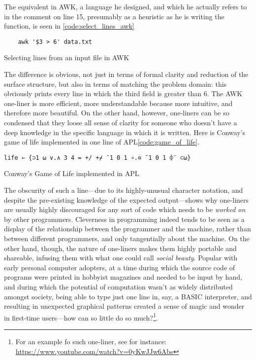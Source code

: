 The equivalent in AWK, a language he designed, and which he actually refers to in the comment on line 15, presumably as a heuristic as he is writing the function, is seen in \ref{code:select_lines_awk}

\begin{listing}
  \begin{verbatim}
    awk '$3 > 6' data.txt
  \end{verbatim}
  \caption{Selecting lines from an input file in AWK}
  \label{code:select_lines_awk}
\end{listing}

The difference is obvious, not just in terms of formal clarity and reduction of the surface structure, but also in terms of matching the problem domain: this obviously prints every line in which the third field is greater than 6. The AWK one-liner is more efficient, more understandable because more intuitive, and therefore more beautiful. On the other hand, however, one-liners can be so condensed that they loose all sense of clarity for someone who doesn't have a deep knowledge in the specific language in which it is written. Here is Conway's game of life implemented in one line of APL\ref{code:game_of_life}.

\begin{listing}
  \begin{verbatim}
life ← {⊃1 ⍵ ∨.∧ 3 4 = +/ +⌿ ¯1 0 1 ∘.⊖ ¯1 0 1 ⌽¨ ⊂⍵}
\end{verbatim}
  \caption{Conway's Game of Life implemented in APL}
  \label{code:game_of_life}
\end{listing}

The obscurity of such a line—due to its highly-unusual character notation, and despite the pre-existing knowledge of the expected output—shows why one-liners are usually highly discouraged for any sort of code which needs to be \emph{worked on} by other programmers. Cleverness in programming indeed tends to be seen as a display of the relationship between the programmer and the machine, rather than between different programmers, and only tangentially about the machine. On the other hand, though, the nature of one-liners makes them highly portable and shareable, infusing them with what one could call \emph{social beauty}. Popular with early personal computer adopters, at a time during which the source code of programs were printed in hobbyist magazines and needed to be input by hand, and during which the potential of computation wasn't as widely distributed amongst society, being able to type just one line in, say, a BASIC interpreter, and resulting in unexpected graphical patterns created a sense of magic and wonder in first-time users—how can so little do so much?\footnote{For an example fo such one-liner, see for instance: \url{https://www.youtube.com/watch?v=0yKwJJw6Abs}}.

